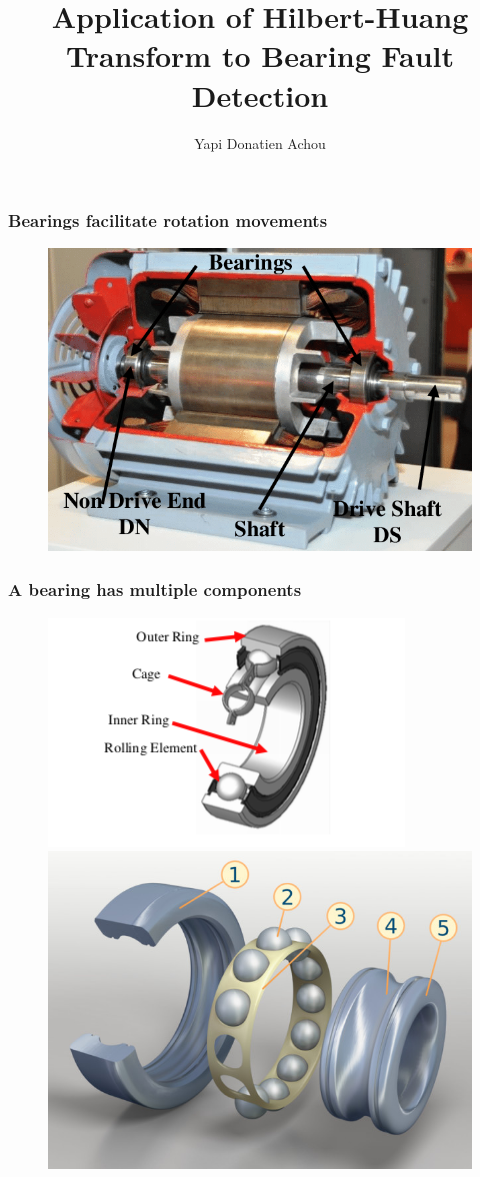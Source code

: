 \documentclass{beamer}
\title[\textcolor{orange}{}] %
 {Application of Hilbert-Huang Transform to Bearing Fault Detection}
\subtitle{}
\author[] %
 {Yapi Donatien Achou}
\begin{document}
 
\frame{\titlepage}
 
 
 
 
 
 
\begin{frame}
\frametitle{Bearings facilitate rotation movements}
\begin{figure}[H]
	\centering
	\includegraphics[width=0.8\linewidth]{motor}
\end{figure}
\end{frame}
\begin{frame}
	\frametitle{A bearing has multiple components}
	\begin{figure}[H]
		\centering
		\includegraphics[width=0.5\linewidth]{bearing-geometry1}
		\includegraphics[width=0.5\linewidth]{bearing-geometry2}
	\end{figure}
\end{frame}
\end{document}
